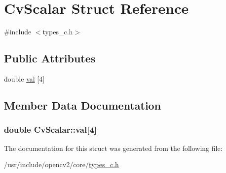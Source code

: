 \hypertarget{structCvScalar}{\section{Cv\-Scalar Struct Reference}
\label{structCvScalar}
}


{\ttfamily \#include $<$types\-\_\-c.\-h$>$}

\subsection*{Public Attributes}
\begin{DoxyCompactItemize}
\item 
double \hyperlink{structCvScalar_a0b2e50205209d6b9927dff483dbc1aba}{val} \mbox{[}4\mbox{]}
\end{DoxyCompactItemize}


\subsection{Member Data Documentation}
\hypertarget{structCvScalar_a0b2e50205209d6b9927dff483dbc1aba}{
\subsubsection[{val}]{\setlength{\rightskip}{0pt plus 5cm}double Cv\-Scalar\-::val\mbox{[}4\mbox{]}}}\label{structCvScalar_a0b2e50205209d6b9927dff483dbc1aba}


The documentation for this struct was generated from the following file\-:\begin{DoxyCompactItemize}
\item 
/usr/include/opencv2/core/\hyperlink{core_2types__c_8h}{types\-\_\-c.\-h}\end{DoxyCompactItemize}
